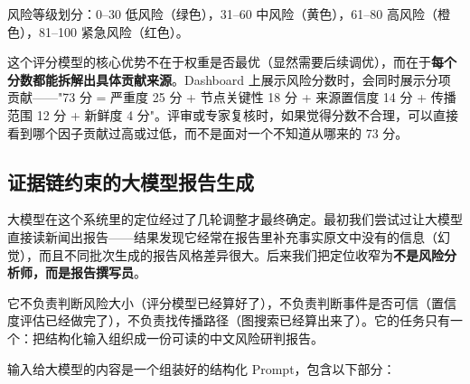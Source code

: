 \documentclass[12pt,a4paper]{ctexart}
\begin{document}
风险等级划分：0--30 低风险（绿色），31--60 中风险（黄色），61--80 高风险（橙色），81--100 紧急风险（红色）。

这个评分模型的核心优势不在于权重是否最优（显然需要后续调优），而在于\textbf{每个分数都能拆解出具体贡献来源}。Dashboard 上展示风险分数时，会同时展示分项贡献——"73 分 = 严重度 25 分 + 节点关键性 18 分 + 来源置信度 14 分 + 传播范围 12 分 + 新鲜度 4 分"。评审或专家复核时，如果觉得分数不合理，可以直接看到哪个因子贡献过高或过低，而不是面对一个不知道从哪来的 73 分。

\subsection{证据链约束的大模型报告生成}

大模型在这个系统里的定位经过了几轮调整才最终确定。最初我们尝试过让大模型直接读新闻出报告——结果发现它经常在报告里补充事实原文中没有的信息（幻觉），而且不同批次生成的报告风格差异很大。后来我们把定位收窄为\textbf{不是风险分析师，而是报告撰写员}。

它不负责判断风险大小（评分模型已经算好了），不负责判断事件是否可信（置信度评估已经做完了），不负责找传播路径（图搜索已经算出来了）。它的任务只有一个：把结构化输入组织成一份可读的中文风险研判报告。

\begin{center}
\end{center}

输入给大模型的内容是一个组装好的结构化 Prompt，包含以下部分：
\end{document}
